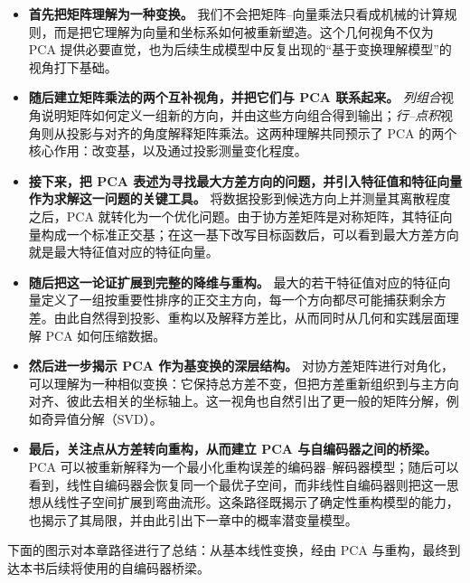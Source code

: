 \begin{itemize}

    \item[\(\rightarrow\)] \textbf{首先把矩阵理解为一种变换。}  
    我们不会把矩阵--向量乘法只看成机械的计算规则，而是把它理解为向量和坐标系如何被重新塑造。这个几何视角不仅为 PCA 提供必要直觉，也为后续生成模型中反复出现的“基于变换理解模型”的视角打下基础。

    \item[\(\rightarrow\)] \textbf{随后建立矩阵乘法的两个互补视角，并把它们与 PCA 联系起来。}  
    \emph{列组合}视角说明矩阵如何定义一组新的方向，并由这些方向组合得到输出；\emph{行--点积}视角则从投影与对齐的角度解释矩阵乘法。这两种理解共同预示了 PCA 的两个核心作用：改变基，以及通过投影测量变化程度。

    \item[\(\rightarrow\)] \textbf{接下来，把 PCA 表述为寻找最大方差方向的问题，并引入特征值和特征向量作为求解这一问题的关键工具。}  
    将数据投影到候选方向上并测量其离散程度之后，PCA 就转化为一个优化问题。由于协方差矩阵是对称矩阵，其特征向量构成一个标准正交基；在这一基下改写目标函数后，可以看到最大方差方向就是最大特征值对应的特征向量。

    \item[\(\rightarrow\)] \textbf{随后把这一论证扩展到完整的降维与重构。}  
    最大的若干特征值对应的特征向量定义了一组按重要性排序的正交主方向，每一个方向都尽可能捕获剩余方差。由此自然得到投影、重构以及解释方差比，从而同时从几何和实践层面理解 PCA 如何压缩数据。

    \item[\(\rightarrow\)] \textbf{然后进一步揭示 PCA 作为基变换的深层结构。}  
    对协方差矩阵进行对角化，可以理解为一种相似变换：它保持总方差不变，但把方差重新组织到与主方向对齐、彼此去相关的坐标轴上。这一视角也自然引出了更一般的矩阵分解，例如奇异值分解（SVD）。

    \item[\(\rightarrow\)] \textbf{最后，关注点从方差转向重构，从而建立 PCA 与自编码器之间的桥梁。}  
    PCA 可以被重新解释为一个最小化重构误差的编码器--解码器模型；随后可以看到，线性自编码器会恢复同一个最优子空间，而非线性自编码器则把这一思想从线性子空间扩展到弯曲流形。这条路径既揭示了确定性重构模型的能力，也揭示了其局限，并由此引出下一章中的概率潜变量模型。

\end{itemize}

下面的图示对本章路径进行了总结：从基本线性变换，经由 PCA 与重构，最终到达本书后续将使用的自编码器桥梁。


